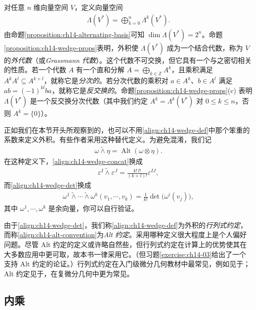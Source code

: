 \documentclass[../../main.tex]{subfiles}
\begin{document}
对任意 $n$ 维向量空间 $V$，定义向量空间
\begin{align*}
\Lambda(V^*)=\bigoplus_{k=0}^n\Lambda^k(V^*).
\end{align*}
由命题\ref{proposition:ch14-alternating-basis}可知 $\dim\Lambda(V^*)=2^n$。命题\ref{proposition:ch14-wedge-props}表明，外积使 $\Lambda(V^*)$ 成为一个结合代数，称为 $V$ 的\emph{外代数}（或\emph{Grassmann 代数}）。这个代数不可交换，但它具有一个与之密切相关的性质。若一个代数 $A$ 有一个直和分解 $A=\bigoplus_{k\in\mathbb Z}A^k$，且乘积满足 $A^kA^l\subseteq A^{k+l}$，就称它是\emph{分次的}。若分次代数的乘积对 $a\in A^k$、$b\in A^l$ 满足 $ab=(-1)^{kl}ba$，就称它是\emph{反交换的}。命题\ref{proposition:ch14-wedge-props}(c) 表明 $\Lambda(V^*)$ 是一个反交换分次代数（其中我们约定 $A^k=\Lambda^k(V^*)$ 对 $0\leqslant k\leqslant n$，否则 $A^k=\{0\}$）。

正如我们在本节开头所观察到的，也可以不用\eqref{align:ch14-wedge-def}中那个笨重的系数来定义外积。有些作者采用这种替代定义。为避免混淆，我们记
\begin{align}
\omega\widetilde\wedge\eta=\operatorname{Alt}(\omega\otimes\eta).\label{align:ch14-alt-convention}
\end{align}
在这种定义下，\eqref{align:ch14-wedge-concat}换成
\begin{align*}
\varepsilon^I\widetilde\wedge\varepsilon^J=\frac{k!\,l!}{(k+l)!}\varepsilon^{IJ},
\end{align*}
而\eqref{align:ch14-wedge-det}换成
\begin{align}
\omega^1\widetilde\wedge\cdots\widetilde\wedge\omega^k(v_1,\cdots ,v_k)=\frac1{k!}\det\bigl(\omega^i(v_j)\bigr),\label{align:ch14-alt-det}
\end{align}
其中 $\omega^1,\cdots ,\omega^k$ 是余向量，你可以自行验证。

由于\eqref{align:ch14-wedge-det}，我们称\eqref{align:ch14-wedge-def}为外积的\emph{行列式约定}，而称\eqref{align:ch14-alt-convention}为\emph{Alt 约定}。采用哪种定义很大程度上是个人偏好问题。尽管 Alt 约定的定义或许略自然些，但行列式约定在计算上的优势使其在大多数应用中更可取，故本书一律采用它。（但习题\ref{exercise:ch14-03}给出了一个支持 Alt 约定的论证。）行列式约定在入门级微分几何教材中最常见，例如见于\cite{Boo86,Cha06,dC92,LeeJeff09,Pet06,Spi99}；Alt 约定见于\cite{KN69}，在复微分几何中更为常见。

\subsection{内乘}
\end{document}

